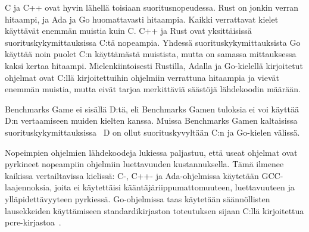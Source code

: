 C ja C++ ovat hyvin lähellä toisiaan suoritusnopeudessa. Rust on jonkin verran
hitaampi, ja Ada ja Go huomattavasti hitaampia. Kaikki verrattavat kielet
käyttävät enemmän muistia kuin C. C++ ja Rust ovat yksittäisissä
suorituskykymittauksissa C:tä nopeampia. Yhdessä suorituskykymittauksista Go
käyttää noin puolet C:n käyttämästä muistista, mutta on samassa mittauksessa
kaksi kertaa hitaampi. Mielenkiintoisesti Rustilla, Adalla ja Go-kielellä
kirjoitetut ohjelmat ovat C:llä kirjoitettuihin ohjelmiin verrattuna hitaampia
ja vievät enemmän muistia, mutta eivät tarjoa merkittäviä säästöjä lähdekoodin
määrään.

Benchmarks Game ei sisällä D:tä, eli Benchmarks Gamen tuloksia ei voi käyttää
D:n vertaamiseen muiden kielten kanssa. Muissa Benchmarks Gamen kaltaisissa
suorituskykymittauksissa~\citep[kuten][jossa D on merkitty
kääntäjätoteutuksesta riippuen joko DMD, LDC tai GDC]{kostya} D on ollut
suorituskyvyltään C:n ja Go-kielen välissä.

Nopeimpien ohjelmien lähdekoodeja lukiessa paljastuu, että useat ohjelmat ovat
pyrkineet nopeampiin ohjelmiin luettavuuden kustannuksella. Tämä ilmenee
kaikissa vertailtavissa kielissä: C-, C++- ja Ada-ohjelmissa käytetään
GCC-laajennoksia, joita ei käytettäisi kääntäjäriippumattomuuteen,
luettavuuteen ja ylläpidettävyyteen pyrkiessä. Go-ohjelmissa taas käytetään
säännöllisten lausekkeiden käyttämiseen standardikirjaston toteutuksen sijaan
C:llä kirjoitettua pcre-kirjastoa~\citep{pcre}.

\FloatBarrier

\null
